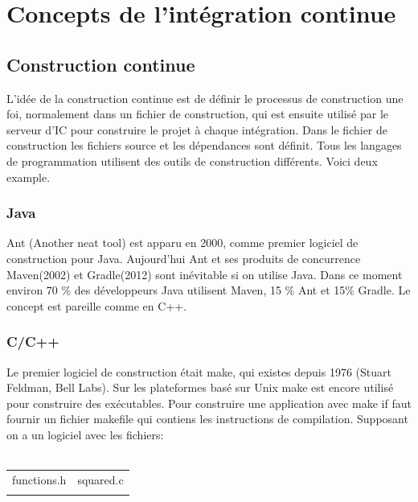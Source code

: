 \section{Concepts de l'intégration continue}

\subsection{Construction continue}
L'idée de la construction continue est de définir le processus de construction une foi, normalement dans un fichier de construction, qui est ensuite utilisé par le serveur d'IC pour construire le projet à chaque intégration. Dans le fichier de construction les fichiers source et les dépendances sont définit. Tous les langages de programmation utilisent des outils de construction différents. Voici deux example.

\subsubsection{Java}
Ant (Another neat tool) est apparu en 2000, comme premier logiciel de construction pour Java.
Aujourd'hui Ant et ses produits de concurrence Maven(2002) et Gradle(2012) sont inévitable si on utilise Java.
Dans ce moment environ 70 \% des développeurs Java utilisent Maven, 15 \% Ant et 15\% Gradle. Le concept est pareille comme en C++. 
\subsubsection{C/C++}
Le premier logiciel de construction était make, qui existes depuis 1976 (Stuart Feldman, Bell Labs). Sur les plateformes basé sur Unix make est encore utilisé pour construire des exécutables.
Pour construire une application avec make if faut fournir un fichier makefile qui contiens les instructions de compilation. Supposant on a un logiciel avec les fichiers: \\ \\

\begin{tabular}{ll}
functions.h&squared.c\\
{}&{}\\
\end{tabular}


